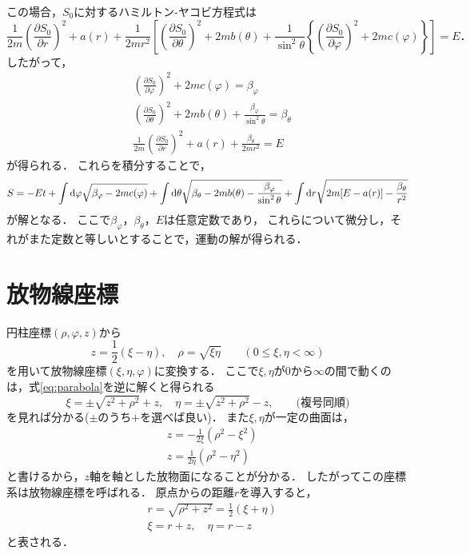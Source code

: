 \documentclass[a4paper,12pt]{jsarticle}
\newcommand{\pdif}[2]{\frac{\partial #1}{\partial #2}}
\begin{document}
	この場合，$S_0$に対するハミルトン-ヤコビ方程式は
	\begin{equation}
	\frac{1}{2m} \left( \pdif{S_0}{r} \right)^2 + a(r)
	+ \frac{1}{2mr^2}
	\left[ \left( \pdif{S_0}{\theta} \right)^2 + 2mb(\theta)
	+ \frac{1}{\sin^2 \theta}
	\left\{ \left( \pdif{S_0}{\varphi} \right)^2 + 2mc(\varphi) \right\}  \right]
	= E \mbox{．}
	\end{equation}
	したがって，
	\begin{align}
	&\left( \pdif{S_0}{\varphi} \right)^2 + 2mc(\varphi) = \beta_{\varphi} \\
	&\left( \pdif{S_0}{\theta} \right)^2 + 2mb(\theta)
	+ \frac{\beta_{\varphi}}{\sin^2 \theta}
	= \beta_{\theta} \\
	& \frac{1}{2m} \left( \pdif{S_0}{r} \right)^2 + a(r)
	+ \frac{\beta_{\theta}}{2mr^2}
	= E
	\end{align}
	が得られる．
	これらを積分することで，
	\begin{equation}
	S = -Et
	+ \int {\rm d}\varphi \sqrt{\beta_{\varphi} - 2mc(\varphi)}
	+ \int {\rm d}\theta \sqrt{\beta_{\theta} - 2mb(\theta)
		- \frac{\beta_{\varphi}}{\sin^2 \theta}}
	+ \int {\rm d}r \sqrt{2m[E-a(r)] - \frac{\beta_{\theta}}{r^2}}
	\end{equation}
	が解となる．
	ここで$\beta_{\varphi}$，$\beta_{\theta}$，$E$は任意定数であり，
	これらについて微分し，それがまた定数と等しいとすることで，運動の解が得られる．
	
	\section{放物線座標}
	円柱座標$(\rho, \varphi, z)$から
	\begin{equation}
	z = \frac{1}{2}(\xi - \eta), \quad \rho = \sqrt{\xi\eta} \qquad
	(0 \le \xi, \eta < \infty) \label{eq:parabola}
	\end{equation}
	を用いて放物線座標$(\xi, \eta, \varphi)$に変換する．
	ここで$\xi, \eta$が$0$から$\infty$の間で動くのは，式\eqref{eq:parabola}を逆に解くと得られる
	\begin{equation}
	\xi = \pm \sqrt{z^2 + \rho^2} + z, \quad
	\eta = \pm \sqrt{z^2 + \rho^2} - z, \qquad
	\mbox{(複号同順)}
	\end{equation}
	を見れば分かる($\pm$のうち$+$を選べば良い)．
	また$\xi, \eta$が一定の曲面は，
	\begin{align}
	&z = -\frac{1}{2\xi} \left( \rho^2 - \xi^2 \right) \\
	&z = \frac{1}{2\eta} \left( \rho^2 - \eta^2 \right)
	\end{align}
	と書けるから，$z$軸を軸とした放物面になることが分かる．
	したがってこの座標系は放物線座標を呼ばれる．
	原点からの距離$r$を導入すると，
	\begin{align}
	&r = \sqrt{\rho^2 + z^2} = \frac{1}{2}(\xi + \eta) \\
	&\xi = r + z, \quad \eta = r - z
	\label{eq:r_parabola}
	\end{align}
	と表される．
	
\end{document}
